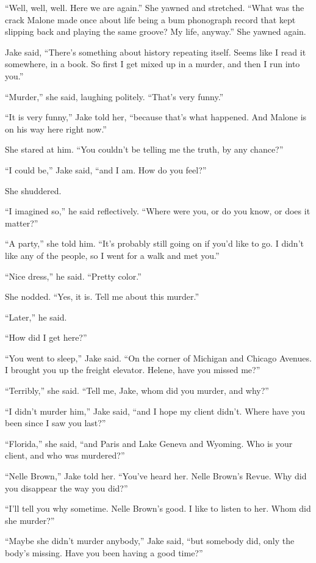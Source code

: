\documentclass{novel}
\begin{document}
“Well, well, well. Here we are again.” She yawned and stretched. “What was the crack Malone made once about life being a bum phonograph record that kept slipping back and playing the same groove? My life, anyway.” She yawned again.

Jake said, “There’s something about history repeating itself. Seems like I read it somewhere, in a book. So first I get mixed up in a murder, and then I run into you.”

“Murder,” she said, laughing politely. “That’s very funny.”

“It is very funny,” Jake told her, “because that’s what happened. And Malone is on his way here right now.”

She stared at him. “You couldn’t be telling me the truth, by any chance?”

“I could be,” Jake said, “and I am. How do you feel?”

She shuddered.

“I imagined so,” he said reflectively. “Where were you, or do you know, or does it matter?”

“A party,” she told him. “It’s probably still going on if you’d like to go. I didn’t like any of the people, so I went for a walk and met you.”

“Nice dress,” he said. “Pretty color.”

She nodded. “Yes, it is. Tell me about this murder.”

“Later,” he said.

“How did I get here?”

“You went to sleep,” Jake said. “On the corner of Michigan and Chicago Avenues. I brought you up the freight elevator. Helene, have you missed me?”

“Terribly,” she said. “Tell me, Jake, whom did you murder, and why?”

“I didn’t murder him,” Jake said, “and I hope my client didn’t. Where have you been since I saw you last?”

“Florida,” she said, “and Paris and Lake Geneva and Wyoming. Who is your client, and who was murdered?”

“Nelle Brown,” Jake told her. “You’ve heard her. Nelle Brown’s Revue. Why did you disappear the way you did?”

“I'll tell you why sometime. Nelle Brown’s good. I like to listen to her. Whom did she murder?”

“Maybe she didn’t murder anybody,” Jake said, “but somebody did, only the body’s missing. Have you been having a good time?”
\end{document}
